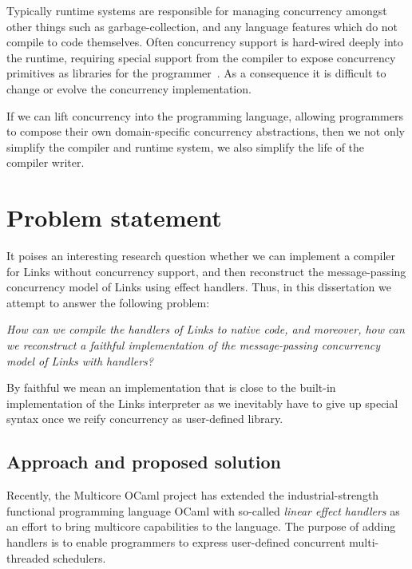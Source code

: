 \documentclass[12pt,mscres,cdtppar,twoside,openright,logo,rightchapter,normalheadings]{infthesis}
\theoremstyle{definition}
\begin{document}
Typically runtime systems are responsible for managing concurrency
amongst other things such as garbage-collection, and any language
features which do not compile to code themselves. Often concurrency
support is hard-wired deeply into the runtime, requiring special
support from the compiler to expose concurrency primitives as
libraries for the programmer~\citep{KC2016}. As a consequence it is
difficult to change or evolve the concurrency implementation.

If we can lift concurrency into the programming language, allowing
programmers to compose their own domain-specific concurrency
abstractions, then we not only simplify the compiler and runtime
system, we also simplify the life of the compiler writer.
%

\section{Problem statement}
\label{sec:problem-statement}

It poises an interesting research question whether we can implement a
compiler for Links without concurrency support, and then reconstruct
the message-passing concurrency model of Links using effect
handlers. Thus, in this dissertation we attempt to answer the
following problem:

\begin{center}
  \emph{How can we compile the handlers of Links to native code, and
    moreover, how can we reconstruct a faithful implementation of the
    message-passing concurrency model of Links with handlers?}
\end{center}

By faithful we mean an implementation that is close to the built-in
implementation of the Links interpreter as we inevitably have to give
up special syntax once we reify concurrency as user-defined library.

\subsection{Approach and proposed solution}

Recently, the Multicore OCaml project \citep{Dolan2015} has extended
the industrial-strength functional programming language OCaml with
so-called \emph{linear effect handlers} as an effort to bring
multicore capabilities to the language. The purpose of adding handlers
is to enable programmers to express user-defined concurrent
multi-threaded schedulers.
\end{document}
